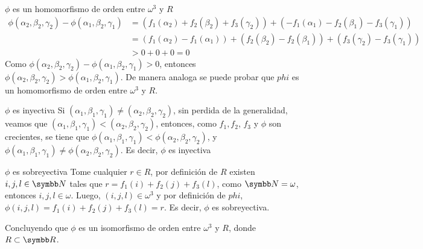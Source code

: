 \documentclass{article}
\begin{document}
\begin{itemize}
\begin{mathcase}{\(\phi\) es un homomorfismo de orden entre \(\omega^3\) y \(R\)}
            \[
                \begin{aligned}
                    \phi(\alpha_2, \beta_2, \gamma_2) - \phi(\alpha_1, \beta_2, \gamma_1) &=
                    (f_1(\alpha_2) + f_2(\beta_2) + f_3(\gamma_2)) + (- f_1(\alpha_1) - f_2(\beta_1) - f_3(\gamma_1)) \\
                    &= (f_1(\alpha_2) - f_1(\alpha_1)) + (f_2(\beta_2) - f_2(\beta_1)) + (f_3(\gamma_2) - f_3(\gamma_1)) \\
                    &> 0 + 0 + 0 = 0
                \end{aligned}
            \]
            Como \(\phi(\alpha_2, \beta_2, \gamma_2) - \phi(\alpha_1, \beta_2, \gamma_1) > 0\), entonces \(\phi(\alpha_2, \beta_2, \gamma_2) > \phi(\alpha_1, \beta_2, \gamma_1)\).
            De manera analoga se puede probar que \(phi\) es un homomorfismo de orden entre \(\omega^3\) y \(R\).
        \end{mathcase}
        \begin{mathcase}{\(\phi\) es inyectiva}
            \vspace{-0.4cm}
            Si 
            \(
                (\alpha_1, \beta_1, \gamma_1) \neq (\alpha_2, \beta_2, \gamma_2) 
            \), 
            sin perdida de la generalidad, veamos que \((\alpha_1, \beta_1, \gamma_1) < (\alpha_2, \beta_2, \gamma_2)\), 
            entonces, como \(f_1, f_2\), \(f_3\) y \(\phi\) son crecientes,
            se tiene que \(\phi(\alpha_1, \beta_1, \gamma_1) < \phi(\alpha_2, \beta_2, \gamma_2)\), 
            y \(\phi(\alpha_1, \beta_1, \gamma_1) \neq \phi(\alpha_2, \beta_2, \gamma_2)\).
            Es decir, \(\phi\) es inyectiva
        \end{mathcase}
        \begin{mathcase}{\(\phi\) es sobreyectiva}
            \vspace{-0.4cm}
            Tome cualquier \(r \in R\), por definición de \(R\) existen \(i, j, l \in \realN\) tales que \(r = f_1(i) + f_2(j) + f_3(l)\),
            como \(\realN = \omega\), entonces \(i, j, l \in \omega\). Luego, \((i,j,l) \in \omega^3\) y por definición de \(phi\), 
            \(\phi(i, j, l) = f_1(i) + f_2(j) + f_3(l) = r\). Es decir, \(\phi\) es sobreyectiva.
        \end{mathcase}
        Concluyendo que \(\phi\) es un isomorfismo de orden entre \(\omega^3\) y \(R\), donde \(R \subset \realR\).
\end{itemize}
\end{document}
